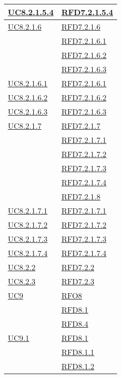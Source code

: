 \begin{longtable}{|>{\centering}m{5cm}|m{5cm}<{\centering}|}
\hyperref[UC8.2.1.5.4]{UC8.2.1.5.4} & \hyperlink{RFD7.2.1.5.4}{RFD7.2.1.5.4}\\ \hline
\hyperref[UC8.2.1.6]{UC8.2.1.6} & \hyperlink{RFD7.2.1.6}{RFD7.2.1.6}\\
& \hyperlink{RFD7.2.1.6.1}{RFD7.2.1.6.1}\\
& \hyperlink{RFD7.2.1.6.2}{RFD7.2.1.6.2}\\
& \hyperlink{RFD7.2.1.6.3}{RFD7.2.1.6.3}\\ \hline
\hyperref[UC8.2.1.6.1]{UC8.2.1.6.1} & \hyperlink{RFD7.2.1.6.1}{RFD7.2.1.6.1}\\ \hline
\hyperref[UC8.2.1.6.2]{UC8.2.1.6.2} & \hyperlink{RFD7.2.1.6.2}{RFD7.2.1.6.2}\\ \hline
\hyperref[UC8.2.1.6.3]{UC8.2.1.6.3} & \hyperlink{RFD7.2.1.6.3}{RFD7.2.1.6.3}\\ \hline
\hyperref[UC8.2.1.7]{UC8.2.1.7} & \hyperlink{RFD7.2.1.7}{RFD7.2.1.7}\\
& \hyperlink{RFD7.2.1.7.1}{RFD7.2.1.7.1}\\
& \hyperlink{RFD7.2.1.7.2}{RFD7.2.1.7.2}\\
& \hyperlink{RFD7.2.1.7.3}{RFD7.2.1.7.3}\\
& \hyperlink{RFD7.2.1.7.4}{RFD7.2.1.7.4}\\
& \hyperlink{RFD7.2.1.8}{RFD7.2.1.8}\\ \hline
\hyperref[UC8.2.1.7.1]{UC8.2.1.7.1} & \hyperlink{RFD7.2.1.7.1}{RFD7.2.1.7.1}\\ \hline
\hyperref[UC8.2.1.7.2]{UC8.2.1.7.2} & \hyperlink{RFD7.2.1.7.2}{RFD7.2.1.7.2}\\ \hline
\hyperref[UC8.2.1.7.3]{UC8.2.1.7.3} & \hyperlink{RFD7.2.1.7.3}{RFD7.2.1.7.3}\\ \hline
\hyperref[UC8.2.1.7.4]{UC8.2.1.7.4} & \hyperlink{RFD7.2.1.7.4}{RFD7.2.1.7.4}\\ \hline
\hyperref[UC8.2.2]{UC8.2.2} & \hyperlink{RFD7.2.2}{RFD7.2.2}\\ \hline
\hyperref[UC8.2.3]{UC8.2.3} & \hyperlink{RFD7.2.3}{RFD7.2.3}\\ \hline
\hyperref[UC9]{UC9} & \hyperlink{RFO8}{RFO8}\\
& \hyperlink{RFD8.1}{RFD8.1}\\
& \hyperlink{RFD8.4}{RFD8.4}\\ \hline
\hyperref[UC9.1]{UC9.1} & \hyperlink{RFD8.1}{RFD8.1}\\
& \hyperlink{RFD8.1.1}{RFD8.1.1}\\
& \hyperlink{RFD8.1.2}{RFD8.1.2}\\

\end{longtable}
